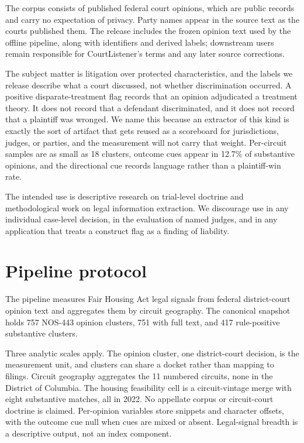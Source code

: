 \documentclass[11pt]{article}
\begin{document}
The corpus consists of published federal court opinions, which are public records and carry no expectation of privacy. Party names appear in the source text as the courts published them. The release includes the frozen opinion text used by the offline pipeline, along with identifiers and derived labels; downstream users remain responsible for CourtListener's terms and any later source corrections.

The subject matter is litigation over protected characteristics, and the labels we release describe what a court discussed, not whether discrimination occurred. A positive disparate-treatment flag records that an opinion adjudicated a treatment theory. It does not record that a defendant discriminated, and it does not record that a plaintiff was wronged. We name this because an extractor of this kind is exactly the sort of artifact that gets reused as a scoreboard for jurisdictions, judges, or parties, and the measurement will not carry that weight. Per-circuit samples are as small as 18 clusters, outcome cues appear in 12.7\% of substantive opinions, and the directional cue records language rather than a plaintiff-win rate.

The intended use is descriptive research on trial-level doctrine and methodological work on legal information extraction. We discourage use in any individual case-level decision, in the evaluation of named judges, and in any application that treats a construct flag as a finding of liability.



\appendix


\section{Pipeline protocol}\label{app:protocol}

The pipeline measures Fair Housing Act legal signals from federal district-court opinion text and aggregates them by circuit geography. The canonical snapshot holds 757 NOS-443 opinion clusters, 751 with full text, and 417 rule-positive substantive clusters.

Three analytic scales apply. The opinion cluster, one district-court decision, is the measurement unit, and clusters can share a docket rather than mapping to filings. Circuit geography aggregates the 11 numbered circuits, none in the District of Columbia. The housing feasibility cell is a circuit-vintage merge with eight substantive matches, all in 2022. No appellate corpus or circuit-court doctrine is claimed. Per-opinion variables store snippets and character offsets, with the outcome cue null when cues are mixed or absent. Legal-signal breadth is a descriptive output, not an index component.
\end{document}
